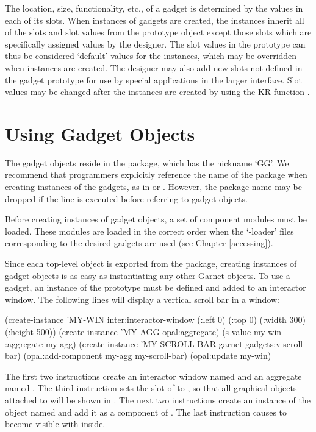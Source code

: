 The location, size, functionality, etc., of a gadget is determined by
the values in each of its slots.  When instances of gadgets are
created, the instances inherit all of the slots and slot values from
the prototype object except those slots which are specifically
assigned values by the designer.  The slot values in the prototype can
thus be considered `default' values for the instances, which may be
overridden when instances are created.  The designer may also add
new slots not defined in the gadget prototype for use by special
applications in the larger interface.
Slot values may be changed after the instances are
created by using the KR function .

\section{Using Gadget Objects}
 
The gadget objects reside in the  package, which
has the nickname `GG'.  We recommend that programmers explicitly
reference the name of the package when creating instances of the
gadgets, as in  or .
However, the package name may be dropped if the line  is executed before referring to gadget objects.

Before creating instances of gadget objects, a set of component
modules must be loaded.  These modules are loaded in the correct order
when the `-loader' files corresponding to the desired gadgets are used
(see Chapter \ref{accessing}).

Since each top-level object is exported from the 
package, creating instances of gadget objects is as easy as
instantiating any other Garnet objects.  To use a gadget, an instance
of the prototype must be defined and added to an interactor window.
The following lines will display a vertical scroll bar in a window:
\begin{group}
\begin{programexample}
(create-instance 'MY-WIN inter:interactor-window
   (:left 0) (:top 0) (:width 300) (:height 500))
(create-instance 'MY-AGG opal:aggregate)
(s-value my-win :aggregate my-agg)
(create-instance 'MY-SCROLL-BAR garnet-gadgets:v-scroll-bar)
(opal:add-component my-agg my-scroll-bar)
(opal:update my-win)
\end{programexample}
\end{group}
 The first two instructions create an
interactor window named  and an aggregate named
.  The third instruction sets the  slot of
 to , so that all graphical objects attached to
 will be shown in .  The next two instructions
create an instance of the  object named
 and add it as a component of .  The last
instruction causes  to become visible with
 inside.

